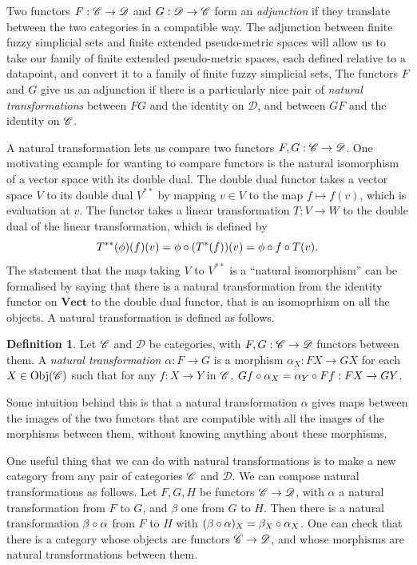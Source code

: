 \documentclass[a4paper,11pt,leqno]{article} \usepackage{amsmath}
\newcommand{\curD}{\mathscr{D}} \newcommand{\curI}{\mathscr{I}}
\newcommand{\Obj}{\ensuremath{\operatorname{Obj}}}
\theoremstyle{definition}
\newtheorem{defn}{Definition}
\begin{document}
Two functors $F: \curC\to\curD$ and $G: \curD\to\curC$ form an
\emph{adjunction} if they translate between the two categories in a compatible
way.
The adjunction between finite fuzzy simplicial sets and finite extended
pseudo-metric spaces will allow us to take our family of finite extended
pseudo-metric spaces, each defined relative to a datapoint, and convert it to
a family of finite fuzzy simplicial sets, 
The functors $F$ and $G$ give us an adjunction if there is a particularly nice
pair of \emph{natural transformations} between $FG$ and the identity on
$\curD$, and between $GF$ and the identity on $\mathscr{C}$.

A natural transformation lets us compare two functors $F, G:
\curC\to\curD$.
One motivating example for wanting to compare functors is the natural
isomorphism of a vector space with its double dual.
The double dual functor takes a vector space $V$ to its double dual $V^{**}$ by
mapping $v\in V$ to the map $f\mapsto f(v)$, which is evaluation at $v$.
The functor takes a linear transformation $T: V\to W$ to the double dual of the
linear transformation, which is defined by
$$T^{**}(\phi)(f)(v) = \phi\circ (T^*(f))(v) = \phi\circ f\circ T(v).$$
The statement that the map taking $V$ to $V^{**}$ is a ``natural isomorphism'' can
be formalised by saying that there is a natural transformation from
the identity functor on $\textbf{Vect}$ to the double dual functor, that is an
isomoprhism on all the objects.
A natural transformation is defined as follows.

\begin{defn}
  Let $\mathscr{C}$ and $\curD$ be categories, with $F, G: \curC\to \curD$ functors
  between them.
  A \emph{natural transformation} $\alpha: F\to G$ is a morphism
  $\alpha_X: FX\to GX$ for each $X\in \Obj(\curC)$ such that for any
  $f: X\to Y$ in $\mathscr{C}$, $Gf\circ \alpha_X = \alpha_Y\circ Ff: FX\to GY$.
\end{defn}

Some intuition behind this is that a natural transformation $\alpha$ gives maps
between the images of the two functors that are compatible with all the
images of the morphisms between them, without knowing anything about these
morphisms. 

One useful thing that we can do with natural transformations is to make a new
category from any pair of categories $\mathscr{C}$ and $\curD$.
We can compose natural transformations as follows.
Let $F, G, H$ be functors $\curC\to \curD$, with $\alpha$ a natural
transformation from $F$ to $G$, and $\beta$ one from $G$ to $H$.
Then there is a natural transformation $\beta\circ\alpha$ from $F$ to $H$ with
$(\beta\circ\alpha)_X = \beta_X\circ\alpha_X$.
One can check that there is a category whose objects are functors
$\curC\to\curD$, and whose morphisms are natural transformations between them.
\end{document}
